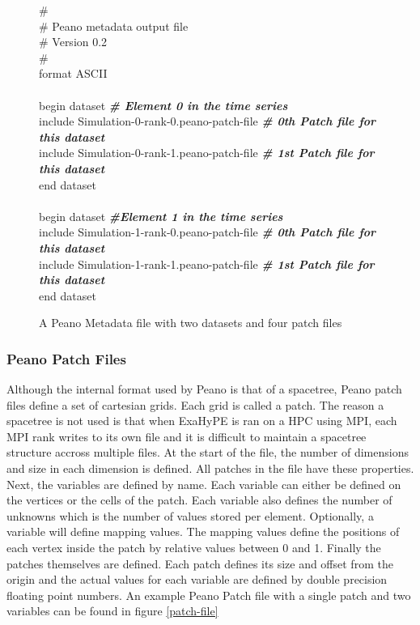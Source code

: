 \documentclass[12pt,a4paper]{article}
\begin{document}
\begin{figure}[h]
\begin{tcolorbox}
\# \\
\# Peano metadata output file \\
\# Version 0.2 \\
\# \\
format ASCII \\
\\
begin dataset \textbf{\textit{\# Element 0 in the time series}} \\
\null\quad include Simulation-0-rank-0.peano-patch-file \textbf{\textit{\# 0th Patch file for this dataset}} \\
\null\quad include Simulation-0-rank-1.peano-patch-file \textbf{\textit{\# 1st Patch file for this dataset}} \\
end dataset \\
 \\
begin dataset \textbf{\textit{\#Element 1 in the time series}} \\
\null\quad include Simulation-1-rank-0.peano-patch-file \textbf{\textit{\# 0th Patch file for this dataset}} \\
\null\quad include Simulation-1-rank-1.peano-patch-file \textbf{\textit{\# 1st Patch file for this dataset}} \\
end dataset
\end{tcolorbox}
\caption{A Peano Metadata file with two datasets and four patch files}
\label{metadata-original}
\end{figure}

\subsubsection{Peano Patch Files}
Although the internal format used by Peano is that of a spacetree, Peano patch files define a set of cartesian grids. Each grid is called a patch. The reason a spacetree is not used is that when ExaHyPE is ran on a HPC using MPI, each MPI rank writes to its own file and it is difficult to maintain a spacetree structure accross multiple files. At the start of the file, the number of dimensions and size in each dimension is defined. All patches in the file have these properties. Next, the variables are defined by name. Each variable can either be defined on the vertices or the cells of the patch. Each variable also defines the number of unknowns which is the number of values stored per element. Optionally, a variable will define mapping values. The mapping values define the positions of each vertex inside the patch by relative values between 0 and 1. Finally the patches themselves are defined. Each patch defines its size and offset from the origin and the actual values for each variable are defined by double precision floating point numbers. An example Peano Patch file with a single patch and two variables can be found in figure \ref{patch-file}
\end{document}

